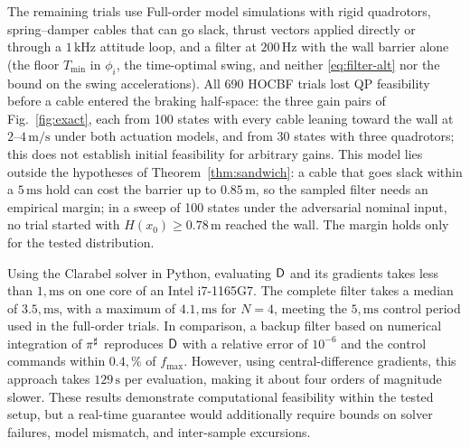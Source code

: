 The remaining trials use Full-order model simulations with rigid quadrotors, spring--damper cables that can go slack, thrust vectors applied directly or through a $1\,\mathrm{kHz}$ attitude loop, and a filter at $200\,\mathrm{Hz}$ with the wall barrier alone (the floor $T_{\min}$ in $\phi_i$, the time-optimal swing, and neither \eqref{eq:filter-alt} nor the bound on the swing accelerations). All 690 HOCBF trials lost QP feasibility before a cable entered the braking half-space: the three gain pairs of Fig.~\ref{fig:exact}, each from 100 states with every cable leaning toward the wall at $2$--$4\,\mathrm{m/s}$ under both actuation models, and from 30 states with three quadrotors; this does not establish initial feasibility for arbitrary gains. This model lies outside the hypotheses of Theorem~\ref{thm:sandwich}: a cable that goes slack within a $5\,\mathrm{ms}$ hold can cost the barrier up to $0.85\,\mathrm m$, so the sampled filter needs an empirical margin; in a sweep of 100 states under the adversarial nominal input, no trial started with $H(x_0)\ge0.78\,\mathrm m$ reached the wall. The margin holds only for the tested distribution.

Using the Clarabel solver in Python, evaluating $\mathsf{D}$ and its gradients takes less than $1,\mathrm{ms}$ on one core of an Intel i7-1165G7. The complete filter takes a median of $3.5,\mathrm{ms}$, with a maximum of $4.1,\mathrm{ms}$ for $N=4$, meeting the $5,\mathrm{ms}$ control period used in the full-order trials. In comparison, a backup filter based on numerical integration of $\pi^{\sharp}$ \cite{chen2021backup} reproduces $\mathsf{D}$ with a relative error of $10^{-6}$ and the control commands within $0.4,\%$ of $f_{\max}$. However, using central-difference gradients, this approach takes $129 \,\mathrm{s}$ per evaluation, making it about four orders of magnitude slower. These results demonstrate computational feasibility within the tested setup, but a real-time guarantee would additionally require bounds on solver failures, model mismatch, and inter-sample excursions.


